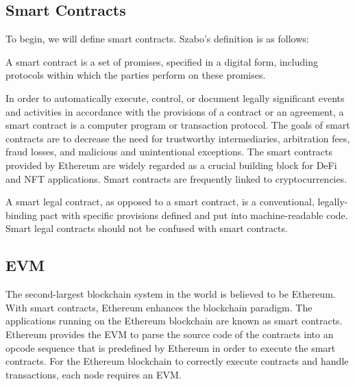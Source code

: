 \subsection{Smart Contracts}

To begin, we will define smart contracts. Szabo's \cite{def1} definition is as follows:

\vspace{.5cm}

\begin{definition}
  A smart contract is a set of promises, specified in a digital form, including protocols within which the parties perform on these promises.
\end{definition}

\vspace{.5cm}

In order to automatically execute, control, or document legally significant events and activities in accordance with the provisions of a contract or an agreement, a smart contract is a computer program or transaction protocol. The goals of smart contracts are to decrease the need for trustworthy intermediaries, arbitration fees, fraud losses, and malicious and unintentional exceptions. The smart contracts provided by Ethereum are widely regarded as a crucial building block for \ac{DeFi} and \ac{NFT} applications. Smart contracts are frequently linked to cryptocurrencies.

\vspace{.5cm}

A smart legal contract, as opposed to a smart contract, is a conventional, legally-binding pact with specific provisions defined and put into machine-readable code. Smart legal contracts should not be confused with smart contracts.

\subsection{\ac{EVM}}

The second-largest blockchain system in the world is believed to be Ethereum. With smart contracts, Ethereum enhances the blockchain paradigm. The applications running on the Ethereum blockchain are known as smart contracts. Ethereum provides the \ac{EVM} to parse the source code of the contracts into an opcode sequence that is predefined by Ethereum in order to execute the smart contracts. For the Ethereum blockchain to correctly execute contracts and handle transactions, each node requires an \ac{EVM}.

